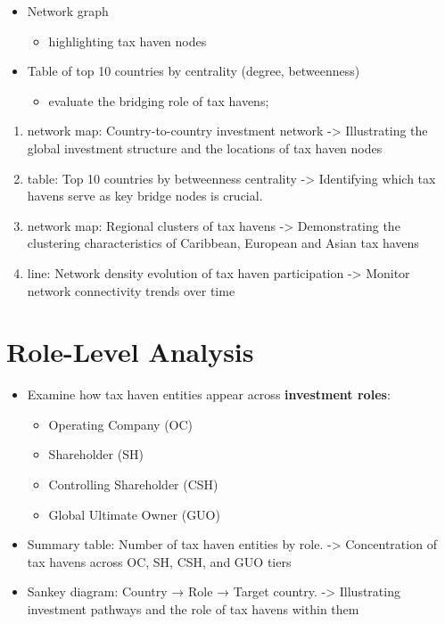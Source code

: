 \documentclass[
  letterpaper,
  DIV=11,
  numbers=noendperiod]{scrreprt}
\providecommand{\tightlist}{%
  \setlength{\itemsep}{0pt}\setlength{\parskip}{0pt}}
\begin{document}
\begin{itemize}
\item
  Network graph

  \begin{itemize}
  \tightlist
  \item
    highlighting tax haven nodes
  \end{itemize}
\item
  Table of top 10 countries by centrality (degree, betweenness)

  \begin{itemize}
  \tightlist
  \item
    evaluate the bridging role of tax havens;
  \end{itemize}
\end{itemize}

\begin{enumerate}
\def\labelenumi{\arabic{enumi}.}
\item
  network map: Country-to-country investment network -\textgreater{}
  Illustrating the global investment structure and the locations of tax
  haven nodes
\item
  table: Top 10 countries by betweenness centrality -\textgreater{}
  Identifying which tax havens serve as key bridge nodes is crucial.
\item
  network map: Regional clusters of tax havens -\textgreater{}
  Demonstrating the clustering characteristics of Caribbean, European
  and Asian tax havens
\item
  line: Network density evolution of tax haven participation
  -\textgreater{} Monitor network connectivity trends over time
\end{enumerate}

\section{Role-Level Analysis}\label{role-level-analysis}

\begin{itemize}
\item
  Examine how tax haven entities appear across \textbf{investment
  roles}:

  \begin{itemize}
  \item
    Operating Company (OC)
  \item
    Shareholder (SH)
  \item
    Controlling Shareholder (CSH)
  \item
    Global Ultimate Owner (GUO)
  \end{itemize}
\item
  Summary table: Number of tax haven entities by role. -\textgreater{}
  Concentration of tax havens across OC, SH, CSH, and GUO tiers
\item
  Sankey diagram: Country → Role → Target country. -\textgreater{}
  Illustrating investment pathways and the role of tax havens within
  them
\end{itemize}
\end{document}
